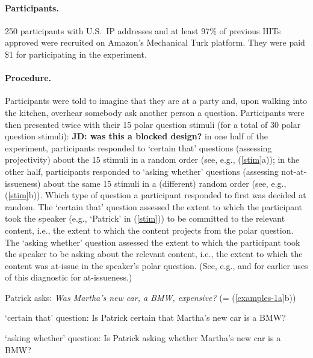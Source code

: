 \documentclass[11pt,fleqn]{article}
\newcommand{\6}{\mbox{$[\hspace*{-.6mm}[$}}
\newcommand{\9}{\mbox{$]\hspace*{-.6mm}]$}}
\begin{document}
\paragraph{Participants.} 250 participants with U.S.\ IP addresses and at least 97\% of previous HITs approved were recruited on Amazon's Mechanical Turk platform. They were paid \$1 for participating in the experiment. 

\paragraph{Procedure.} Participants were told to imagine that they are at a party and, upon walking into the kitchen, overhear somebody ask another person a question. Participants were then presented twice with their 15 polar question stimuli (for a total of 30 polar question stimuli): {\bf JD: was this a blocked design?} in one half of the experiment, participants responded to `certain that' questions (assessing projectivity) about the 15 stimuli in a random order (see, e.g., (\ref{stim}a)); in the other half, participants responded to `asking whether' questions (assessing not-at-issueness) about the same 15 stimuli in a (different) random order (see, e.g., (\ref{stim}b)). Which type of question a participant responded to first was decided at random. The `certain that' question assessed the extent to which the participant took the speaker (e.g., `Patrick' in (\ref{stim})) to be committed to the relevant content, i.e., the extent to which the content projects from the polar question. The `asking whether' question assessed the extent to which the participant took the speaker to be asking about the relevant content, i.e., the extent to which the content was at-issue in the speaker's polar question. (See, e.g., \citealt[731]{amaral-etal07} and \citealt{tonhauser-sula6} for earlier uses of this diagnostic for at-issueness.)

\begin{exe}

\ex\label{stim} Patrick asks: {\em Was Martha's new car, a BMW, expensive?} (= (\ref{examples-1a}b))

\begin{xlist}
\ex `certain that' question: Is Patrick certain that Martha's new car is a BMW?

\ex `asking whether' question: Is Patrick asking whether Martha's new car is a BMW?

\end{xlist}

\end{exe}
\end{document}
